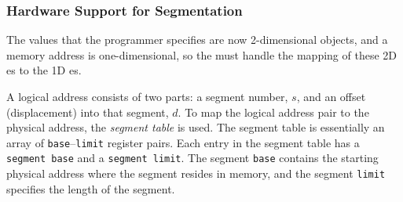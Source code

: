 \subsubsection{Hardware Support for Segmentation}\label{subsubsec:Segmentation_Hardware_Support}
The values that the programmer specifies are now 2-dimensional objects, and a memory address is one-dimensional, so the  must handle the mapping of these 2D es to the 1D es.

A logical address consists of two parts: a segment number, $s$, and an offset (displacement) into that segment, $d$.
To map the logical address pair to the physical address, the \emph{segment table} is used.
The segment table is essentially an array of \texttt{base}–\texttt{limit} register pairs.
Each entry in the segment table has a \texttt{segment base} and a \texttt{segment limit}.
The segment \texttt{base} contains the starting physical address where the segment resides in memory, and the segment \texttt{limit} specifies the length of the segment.

